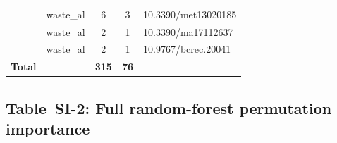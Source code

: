 \begin{table}[htbp]
\begin{tabular}{llccp{5.5cm}}
\citeauthor{buryakov2023met}~\cite{buryakov2023met}& waste\_al & 6 & 3 & 10.3390/met13020185 \\
\citeauthor{urbonav2024}~\cite{urbonav2024}    & waste\_al & 2 & 1 & 10.3390/ma17112637 \\
\citeauthor{fadhilah2023}~\cite{fadhilah2023}  & waste\_al & 2 & 1 & 10.9767/bcrec.20041 \\
\midrule
\textbf{Total} & & \textbf{315} & \textbf{76} & \\
\bottomrule
\end{tabular}
\end{table}

\subsection*{Table~SI-2: Full random-forest permutation importance}

